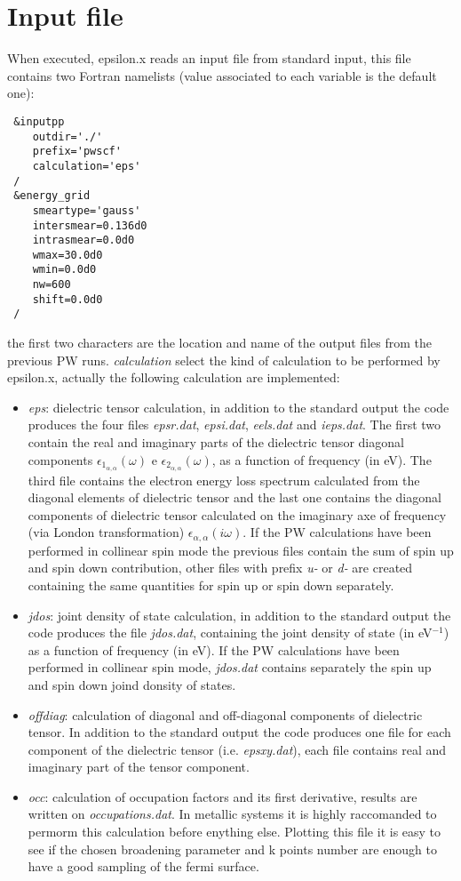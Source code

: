 \documentclass[twocolumn]{article}
\begin{document}
\section{Input file}
When executed, epsilon.x reads an input file from standard input, this file contains two Fortran namelists
(value associated to each variable is the default one):
\begin{verbatim}
 &inputpp
    outdir='./'
    prefix='pwscf'
    calculation='eps'
 /
 &energy_grid
    smeartype='gauss'
    intersmear=0.136d0
    intrasmear=0.0d0
    wmax=30.0d0
    wmin=0.0d0
    nw=600
    shift=0.0d0
 /
\end{verbatim}
the first two characters are the location and name of the output files from the previous PW runs. \emph{calculation}
select the kind of calculation to be performed by epsilon.x, actually the following calculation are implemented:
\begin{itemize}
\item  \emph{eps}: dielectric tensor calculation, in addition to the standard output the code produces the four files
\emph{epsr.dat}, \emph{epsi.dat}, \emph{eels.dat} and \emph{ieps.dat}. The first two contain the real and imaginary
parts of the dielectric
tensor diagonal components $\epsilon_{1_{\alpha,\alpha}}(\omega)$ e $\epsilon_{2_{\alpha,\alpha}}(\omega)$,
as a function of frequency (in eV). The third file contains the electron energy loss spectrum calculated from the diagonal
elements of dielectric tensor and the last one contains the diagonal components of
dielectric tensor calculated on the imaginary axe of frequency (via London transformation)
$\epsilon_{\alpha,\alpha}(i\omega)$. If the PW calculations have been performed in collinear spin mode the previous files 
contain the sum of spin up and spin down contribution, other files with prefix \emph{u-} or  \emph{d-} are created containing 
the same quantities for spin up or spin down separately. 
\item  \emph{jdos}: joint density of state calculation, in addition to the standard output the code produces the file
\emph{jdos.dat}, containing the joint density of state (in eV$^{-1}$) as a function of frequency (in eV). If the PW 
calculations have been performed in collinear spin mode, \emph{jdos.dat} contains separately the spin up and spin down 
joind donsity of states.  
\item  \emph{offdiag}: calculation of diagonal and off-diagonal components of dielectric tensor. In addition
to the standard output the code produces one file for each component of the dielectric tensor (i.e.
\emph{epsxy.dat}), each file contains real and imaginary part of the tensor component.
\item  \emph{occ}: calculation of occupation factors and its first derivative, results are written on 
\emph{occupations.dat}. In metallic systems it is highly raccomanded to permorm this calculation before
enything else.  
Plotting this file it is easy to see if the chosen broadening parameter and k points number 
are enough to have a good sampling of the fermi surface.
\end{itemize}
\end{document}
